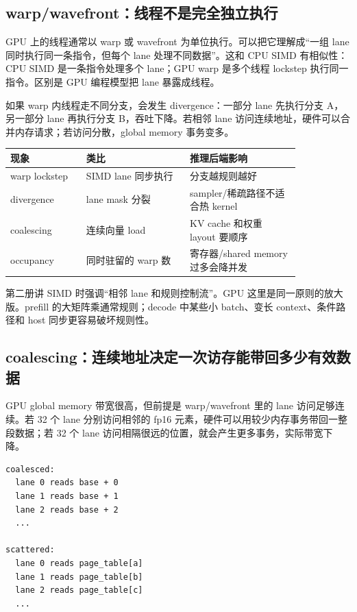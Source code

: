 \subsection{warp/wavefront：线程不是完全独立执行}

GPU 上的线程通常以 warp 或 wavefront 为单位执行。可以把它理解成“一组 lane 同时执行同一条指令，但每个 lane 处理不同数据”。这和 CPU SIMD 有相似性：CPU SIMD 是一条指令处理多个 lane；GPU warp 是多个线程 lockstep 执行同一指令。区别是 GPU 编程模型把 lane 暴露成线程。

如果 warp 内线程走不同分支，会发生 divergence：一部分 lane 先执行分支 A，另一部分 lane 再执行分支 B，吞吐下降。若相邻 lane 访问连续地址，硬件可以合并内存请求；若访问分散，global memory 事务变多。

\begin{center}
\begin{tabular}{p{0.22\linewidth}p{0.30\linewidth}p{0.32\linewidth}}
\toprule
现象 & 类比 & 推理后端影响 \\
\midrule
warp lockstep & SIMD lane 同步执行 & 分支越规则越好 \\
divergence & lane mask 分裂 & sampler/稀疏路径不适合热 kernel \\
coalescing & 连续向量 load & KV cache 和权重 layout 要顺序 \\
occupancy & 同时驻留的 warp 数 & 寄存器/shared memory 过多会降并发 \\
\bottomrule
\end{tabular}
\end{center}

第二册讲 SIMD 时强调“相邻 lane 和规则控制流”。GPU 这里是同一原则的放大版。prefill 的大矩阵乘通常规则；decode 中某些小 batch、变长 context、条件路径和 host 同步更容易破坏规则性。

\subsection{coalescing：连续地址决定一次访存能带回多少有效数据}

GPU global memory 带宽很高，但前提是 warp/wavefront 里的 lane 访问足够连续。若 32 个 lane 分别访问相邻的 fp16 元素，硬件可以用较少内存事务带回一整段数据；若 32 个 lane 访问相隔很远的位置，就会产生更多事务，实际带宽下降。

\begin{lstlisting}[numbers=none,caption={coalesced 与 scattered 访问的差异}]
coalesced:
  lane 0 reads base + 0
  lane 1 reads base + 1
  lane 2 reads base + 2
  ...

scattered:
  lane 0 reads page_table[a]
  lane 1 reads page_table[b]
  lane 2 reads page_table[c]
  ...
\end{lstlisting}


